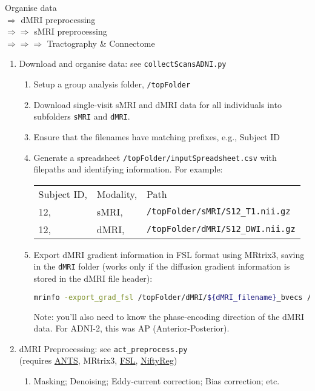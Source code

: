 \documentclass[12pt]{elsarticle}
\newcommand{\sMRI}{\texttt{sMRI}}
\newcommand{\dMRI}{\texttt{dMRI}}
\newcommand{\topFolder}{\texttt{/topFolder}}
\begin{document}
\noindent{}Organise data \\ $\Rightarrow$ dMRI preprocessing \\ $\Rightarrow$$\Rightarrow$ sMRI preprocessing \\ $\Rightarrow$$\Rightarrow$$\Rightarrow$ Tractography \& Connectome
\begin{enumerate}
	\item Download and organise data: see \verb|collectScansADNI.py|
	\begin{enumerate}
		\item Setup a group analysis folder, \topFolder{}
		\item Download single-visit sMRI and dMRI data for all individuals into subfolders \sMRI{} and \dMRI{}.
		\item Ensure that the filenames have matching prefixes, e.g., Subject ID
		\item Generate a spreadsheet \topFolder\verb|/inputSpreadsheet.csv| with filepaths and identifying information. For example:\\
		{\centering
		\begin{tabular}{lll}
			Subject ID, & Modality, & Path \\
			12, & sMRI, & \verb|/topFolder/sMRI/S12_T1.nii.gz| \\
			12, & dMRI, & \verb|/topFolder/dMRI/S12_DWI.nii.gz|
		\end{tabular}}
		\item Export dMRI gradient information in FSL format using MRtrix3, saving in the \dMRI{} folder (works only if the diffusion gradient information is stored in the dMRI file header): 
\begin{lstlisting}[language=bash]
mrinfo -export_grad_fsl /topFolder/dMRI/${dMRI_filename}_bvecs /topFolder/dMRI/${dMRI_filename}_bvals /topFolder/dMRI/${dMRI_filename}.nii.gz
\end{lstlisting} Note: you'll also need to know the phase-encoding direction of the dMRI data. For ADNI-2, this was AP (Anterior-Posterior).
	\end{enumerate}
	\item dMRI Preprocessing: see \verb|act_preprocess.py| \\(requires \href{http://stnava.github.io/ANTs/}{ANTS}, MRtrix3, \href{https://fsl.fmrib.ox.ac.uk/fsl/fslwiki}{FSL}, \href{https://sourceforge.net/projects/niftyreg/files/}{NiftyReg})
	\begin{enumerate}
		\item Masking; Denoising; Eddy-current correction; Bias correction; etc.

\end{enumerate}
\end{enumerate}$$
\end{document}
